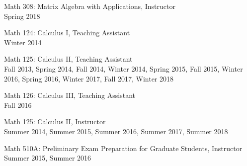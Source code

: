 \documentclass[12pt]{article}
\newenvironment{date_section}
	{
	\vspace{-1ex}
	\leftmargini = 15ex
		\begin{itemize}[
			labelsep = *,
			labelwidth = 9ex,
			labelindent = 0ex,
			itemindent = !,
			font=\normalfont,
			align=parleft
		]{}
		\itemsep=-1.5mm
	}
	{\end{itemize}\vspace{-2ex}}
\newcommand{\yearmo}[2]{
	\item[
		{\makebox[1ex][r]{#1}}
		\hspace{1ex}
		{\makebox[1ex][l]{#2} }
		] }
\begin{document}
	\begin{date_section}
		\yearmo{}{} Math 308: Matrix Algebra with Applications, Instructor
		\\
		Spring 2018

		\yearmo{}{} Math 124: Calculus I, Teaching Assistant
		\\
		Winter 2014

		\yearmo{}{} Math 125: Calculus II, Teaching Assistant
		\\
		Fall 2013, Spring 2014, Fall 2014, Winter 2014, Spring 2015, Fall 2015, Winter 2016, Spring 2016, Winter 2017, Fall 2017, Winter 2018

		\yearmo{}{} Math 126: Calculus III, Teaching Assistant
		\\
		Fall 2016

		\yearmo{}{} Math 125: Calculus II, Instructor
		\\
		Summer 2014, Summer 2015, Summer 2016, Summer 2017, Summer 2018

		\yearmo{}{} Math 510A: Preliminary Exam Preparation for Graduate Students, Instructor
		\\
		Summer 2015, Summer 2016



	\end{date_section}
\end{document}
